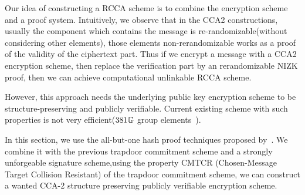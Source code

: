 Our idea of constructing a RCCA scheme is to combine the encryption scheme and a proof system.
Intuitively, we observe that in the CCA2 constructions, usually the component which contains the message is re-randomizable(without considering other elements),
those elements non-rerandomizable works as a proof of the validity of the ciphertext part.
Thus if we encrypt a message with a CCA2 encryption scheme,
then replace the verification part by an rerandomizable NIZK proof, then we can achieve computational unlinkable RCCA scheme.

However, this approach needs the underlying public key encryption scheme to be structure-preserving and publicly verifiable.
Current existing scheme with such properties is not very efficient($381\mathbb{G}$ group elements~\cite{DBLP:conf/pkc/AbeDKNO13}).

In this section, we use the all-but-one hash proof techniques proposed by~\cite{DBLP:conf/tcc/LibertY12}. We combine it with the previous trapdoor commitment scheme and a strongly unforgeable signature scheme,using the property CMTCR (Chosen-Message Target Collision Resistant) of the trapdoor commitment scheme, we can construct a wanted CCA-2 structure preserving publicly verifiable encryption scheme.
